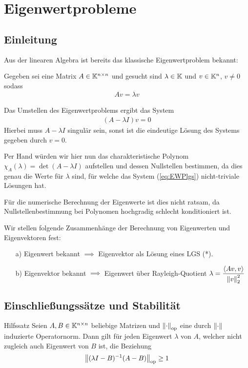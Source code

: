 \section{Eigenwertprobleme}

\subsection{Einleitung}
Aus der linearen Algebra ist bereits das klassische Eigenwertproblem bekannt:

Gegeben sei eine Matrix $A\in\mathbb K^{n\times n}$ und gesucht sind 
$\lambda\in\mathbb K$ und $v\in\mathbb K^n$, $v\neq 0$ 
sodass 
%
\begin{align*}
  Av=\lambda v
\end{align*}

Das Umstellen des Eigenwertproblems ergibt das System 
%
\begin{align*}
  (A-\lambda I)v=0
  \tag{*}\label{eq:EWPlgs}
\end{align*}
Hierbei muss $A-\lambda I$ singulär sein, sonst ist die eindeutige Lösung des Systems gegeben durch $v=0$.

Per Hand würden wir hier nun das charakteristische Polynom $\chi_A(\lambda)=\det(A-\lambda I)$ aufstellen und 
dessen Nullstellen bestimmen, da dies genau die Werte für $\lambda$ sind, für welche das System (\ref{eq:EWPlgs}) 
nicht-triviale Lösungen hat. 

Für die numerische Berechnung der Eigenwerte ist dies nicht ratsam, da Nullstellenbestimmung bei Polynomen 
hochgradig schlecht konditioniert ist. 

Wir stellen folgende Zusammenhänge der Berechnung von Eigenwerten und Eigenvektoren fest:

\begin{enumerate}
  \item[a)] 
    Eigenwert bekannt $\implies$ Eigenvektor als Lösung eines LGS (*).
  \item[b)] 
    Eigenvektor bekannt $\implies$ Eigenwert über Rayleigh-Quotient 
    $\lambda=\dfrac{\langle Av,v\rangle}{\vertn{2}{v}_2^2}$ 
\end{enumerate}

\subsection{Einschließungssätze und Stabilität}

\begin{colbox}{Hilfssatz}\label{hsatz:normIneq}
  Seien $A,B\in\mathbb K^{n\times n}$ beliebige Matrizen und $\vertn{2}{\cdot}_{\op}$ eine durch $\vertn{2}{\cdot}$
  induzierte Operatornorm. 
  Dann gilt für jeden Eigenwert $\lambda$ von $A$, welcher nicht zugleich auch Eigenwert von $B$ ist, die Beziehung
  \begin{align*}
    \vertn{2}{(\lambda I-B)^{-1}(A-B)}_{\op}\geq 1
  \end{align*}
\end{colbox}

